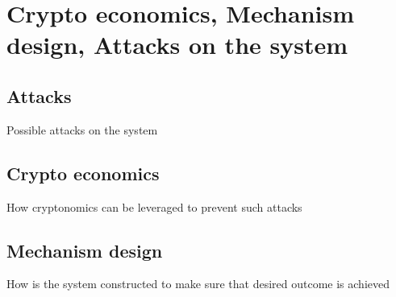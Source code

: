 \section{Crypto economics, Mechanism design, Attacks on the system}
\subsection{Attacks}
Possible attacks on the system
\subsection{Crypto economics}
How cryptonomics can be leveraged to prevent such attacks
\subsection{Mechanism design}
How is the system constructed to make sure that desired outcome is achieved